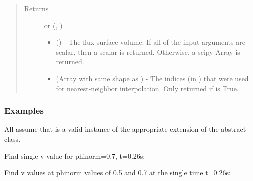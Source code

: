 \documentclass[letterpaper,10pt,english]{sphinxmanual}
\begin{document}
\begin{fulllineitems}
\begin{fulllineitems}
\begin{quote}
\begin{description}
\begin{itemize}
\end{itemize}

\item[{Returns}] \leavevmode

 or (, )
\begin{itemize}
\item {} 
 () - The flux surface volume. If
all of the input arguments are scalar, then a scalar is returned.
Otherwise, a scipy Array is returned.

\item {} 
 (Array with same shape as ) - The indices
(in ) that were used for
nearest-neighbor interpolation. Only returned if  is
True.

\end{itemize}


\end{description}\end{quote}
\subsubsection*{Examples}

All assume that  is a valid instance of the appropriate
extension of the {\hyperref[\detokenize{eqtools:eqtools.core.Equilibrium}]{}} abstract class.

Find single v value for phinorm=0.7, t=0.26s:

\begin{sphinxVerbatim}[commandchars=\\\{\}]
   
\end{sphinxVerbatim}

Find v values at phinorm values of 0.5 and 0.7 at the single time
t=0.26s:

\begin{sphinxVerbatim}[commandchars=\\\{\}]
  \PYG{p}{[} \PYG{p}{]} 
\end{sphinxVerbatim}


\end{fulllineitems}
\end{fulllineitems}
\end{document}
